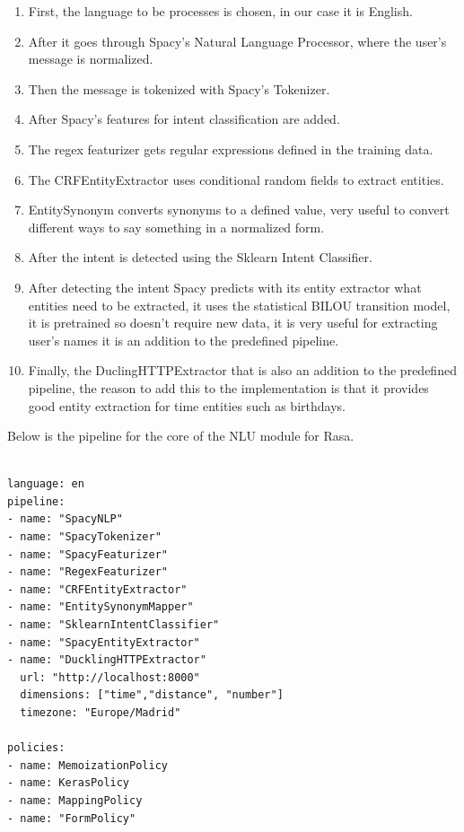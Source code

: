 \begin{enumerate}
	\item {First, the language to be processes is chosen, in our case it is English.}
	\item {After it goes through Spacy’s Natural Language Processor, where the user’s message is normalized.}
	\item {Then the message is tokenized with Spacy’s Tokenizer.}
	\item {After Spacy’s features for intent classification are added.}
	\item {The regex featurizer gets regular expressions defined in the training data.}
	\item {The CRFEntityExtractor uses conditional random fields to extract entities.}
	\item {EntitySynonym converts synonyms to a defined value, very useful to convert different ways to say something in a normalized form.}
	\item {After the intent is detected using the Sklearn Intent Classifier.}
	\item {After detecting the intent Spacy predicts with its entity extractor what entities need to be extracted, it uses the statistical BILOU transition model, it is pretrained so doesn’t require new data, it is very useful for extracting user’s names it is an addition to the predefined pipeline.}
	\item {Finally, the DuclingHTTPExtractor that is also an addition to the predefined pipeline, the reason to add this to the implementation is that it provides good entity extraction for time entities such as birthdays.}
\end{enumerate}

Below is the pipeline for the core of the NLU module for Rasa.

\begin{lstlisting}[caption={Rasa Pipeline},captionpos=b]

language: en
pipeline:
- name: "SpacyNLP"
- name: "SpacyTokenizer"
- name: "SpacyFeaturizer"
- name: "RegexFeaturizer"
- name: "CRFEntityExtractor"
- name: "EntitySynonymMapper"
- name: "SklearnIntentClassifier"
- name: "SpacyEntityExtractor"
- name: "DucklingHTTPExtractor"
  url: "http://localhost:8000"
  dimensions: ["time","distance", "number"]
  timezone: "Europe/Madrid"

policies:
- name: MemoizationPolicy
- name: KerasPolicy
- name: MappingPolicy
- name: "FormPolicy"


\end{lstlisting}

